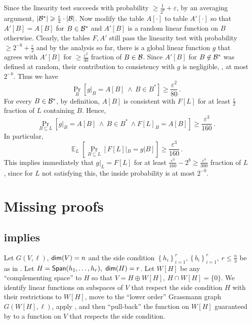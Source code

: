 \documentclass{toc}
\newcommand\set[1]{{\left\{ #1 \right\}}}
\newcommand\Prob[2]{{\Pr_{#1}\left[ {#2} \right]}}
\newcommand\Expect[2]{{\mathop{\mathbb{E}}_{#1}\left[ {#2} \right]}}
\newcommand\eps{\varepsilon}
\newcommand*\xor{\mathbin{\oplus}}
\renewcommand\geq{\geqslant}
\renewcommand\leq{\leqslant}
\begin{document}
Since the linearity test succeeds with probability $\geq \frac{1}{2^b} + \eps$, by an averaging argument, $|{\cal B}^*| \geq \frac{\eps}{2} \cdot |{\cal B}|$.
Now modify the table $A[\cdot]$ to table $A'[\cdot]$ so that $A'[B] = A[B]$ for $B \in {\cal B}^*$ and $A'[B]$ is a random linear function on $B$ otherwise.
Clearly, the tables $F, A'$ still pass the linearity test with probability $\geq 2^{-b} + \frac{\eps}{2}$ and by the analysis so far, there is a global linear
function $g$ that agrees with $A'[B]$ for $\geqslant \frac{\eps^2}{40}$ fraction of $B \in {\cal B}$. Since $A'[B]$ for $B \not\in {\cal B}^*$ was defined
at random, their contribution to consistency with $g$ is negligible, \ie, at most $2^{-b}$. Thus we have
 $$ \Prob{B}{ g|_B = A[B]  ~\wedge ~B \in B^*    }  \geq  \frac{\eps^2}{80}\,. $$%
For every $B \in {\cal B}^*$, by definition, $A[B]$ is consistent with $F[L]$ for at least $\frac{\eps}{2}$ fraction of $L$ containing $B$.
Hence,
   $$ \Prob{B \subseteq L}{ g|_B = A[B]  ~\wedge ~B \in B^*  ~\wedge F[L]_B = A[B]  }  \geq  \frac{\eps^3}{160}\,. $$%
In particular,
   $$ \Expect{L} {  \Prob{B \subseteq L} {  F[L]|_B = g|B   }          } \geq  \frac{\eps^3}{160}\,. $$%
This implies immediately that $g|_L = F[L]$ for at least  $ \frac{\eps^3}{160} - 2^b \geq  \frac{\eps^3}{300} $ fraction of $L$, since for $L$ not satisfying this,
the inside probability is at most $2^{-b}$.



\section{Missing proofs}
\subsection{  implies }\label{appendix:hyp_side_cond}

Let $G(V,\ell)$, ${\sf dim}(V)=n$ and the side condition $\set{h_i}_{i=1}^r, \set{b_i}_{i=1}^r, ~r \leq \frac{n}{3}$ be as in . Let
$H = {\sf Span}(h_1,\ldots,h_r), ~{\sf dim}(H)=r$. Let $W[H]$ be any ``complementing space'' to $H$ so that
 $V = H \xor W[H], \ H \cap W[H] = \{0\}$.
We identify linear
functions on subspaces of $V$ that respect the side condition $H$  with  their restrictions to $W[H]$, move to the ``lower order'' Grassmann graph $G(W[H], \ell)$,
apply , and then ``pull-back'' the function on $W[H]$ guaranteed by  to a function on $V$
that respects the side condition.
\end{document}
